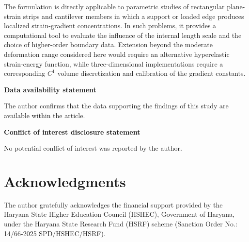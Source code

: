 \documentclass[preprint,12pt]{elsarticle}
\begin{document}
The formulation is directly applicable to parametric studies of rectangular
plane-strain strips and cantilever members in which a support or loaded edge
produces localized strain-gradient concentrations. In such problems, it provides
a computational tool to evaluate the influence of the internal length scale
and the choice of higher-order boundary data. Extension beyond the moderate
deformation range considered here would require an alternative hyperelastic
strain-energy function, while three-dimensional implementations require a
corresponding $C^1$ volume discretization and calibration of the gradient constants.

\noindent\textbf{Data availability statement}

The author confirms that the data supporting the findings of this study
are available within the article.

\noindent\textbf{Conflict of interest disclosure statement}

No potential conflict of interest was reported by the author.

\section*{Acknowledgments}
The author gratefully acknowledges the financial support provided by the Haryana State Higher Education Council (HSHEC), Government of Haryana, under the Haryana State Research Fund (HSRF) scheme (Sanction Order No.: 14/66-2025 SPD/HSHEC/HSRF).





\end{document}
